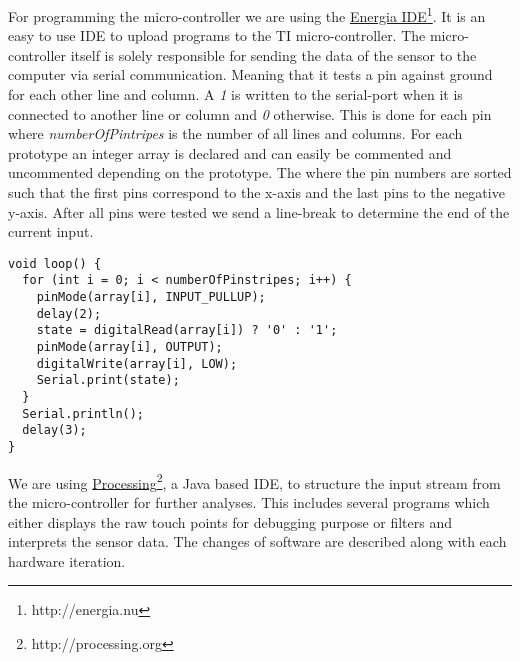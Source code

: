 For programming the micro-controller we are using the \href{http://energia.nu}{Energia IDE}\footnote{http://energia.nu}. It is an easy to use IDE to upload programs to the TI micro-controller. The micro-controller itself is solely responsible for sending the data of the sensor to the computer via serial communication. Meaning that it tests a pin against ground for each other line and column. A \emph{1} is written to the serial-port when it is connected to another line or column and \emph{0} otherwise. This is done for each pin where \emph{numberOfPintripes} is the number of all lines and columns. For each prototype an integer array is declared and can easily be commented and uncommented depending on the prototype. The where the pin numbers are sorted such that the first pins correspond to the x-axis and the last pins to the negative y-axis. After all pins were tested we send a line-break to determine the end of the current input.\\  
\newline
{}
\begin{lstlisting}
void loop() {
  for (int i = 0; i < numberOfPinstripes; i++) {
    pinMode(array[i], INPUT_PULLUP);
    delay(2);
    state = digitalRead(array[i]) ? '0' : '1';
    pinMode(array[i], OUTPUT);
    digitalWrite(array[i], LOW);
    Serial.print(state);
  }
  Serial.println();
  delay(3);
}
\end{lstlisting}
We are using \href{http://processing.org}{Processing}\footnote{http://processing.org}, a Java based IDE, to structure the input stream from the micro-controller for further analyses. This includes several programs which either displays the raw touch points for debugging purpose or filters and interprets the sensor data. The changes of software are described along with each hardware iteration. 

